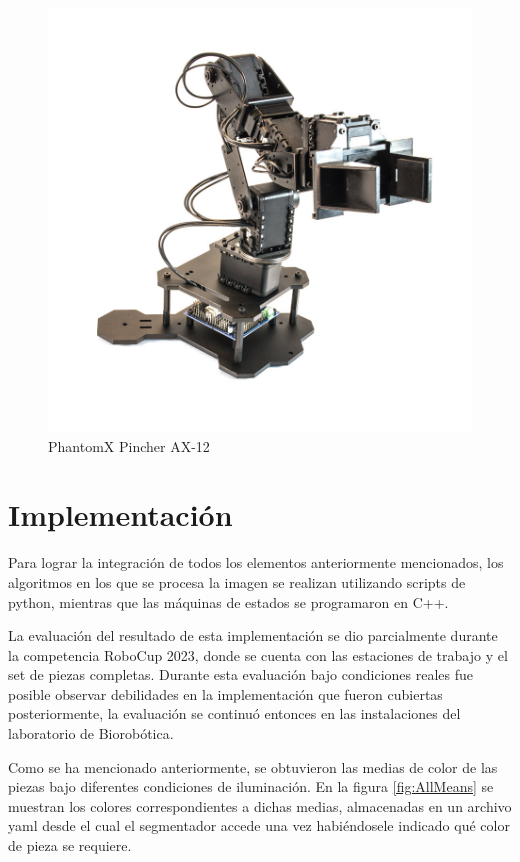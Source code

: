             \begin{figure}[ht]
                \centering
                \includegraphics[scale=0.2]{Figures/Phantom_Pincher.jpg}
                    \caption{PhantomX Pincher AX-12 \cite{Inerbotix_pincher_arm}}
                    \label{fig:Phantom_Pincher}
            \end{figure}

\section{Implementación}
Para lograr la integración de todos los elementos anteriormente mencionados, los algoritmos en los que se procesa la imagen se realizan utilizando scripts de python, mientras que las máquinas de estados se programaron en C++.

La evaluación del resultado de esta implementación se dio parcialmente durante la competencia RoboCup 2023, donde se cuenta con las estaciones de trabajo y el set de piezas completas. Durante esta evaluación bajo condiciones reales fue posible observar debilidades en la implementación que fueron cubiertas posteriormente, la evaluación se continuó entonces en las instalaciones del laboratorio de Biorobótica. 

Como se ha mencionado anteriormente, se obtuvieron las medias de color de las piezas bajo diferentes condiciones de iluminación. En la figura \ref{fig:AllMeans} se muestran los colores correspondientes a dichas medias, almacenadas en un archivo yaml desde el cual el segmentador accede una vez habiéndosele indicado qué color de pieza se requiere. 

